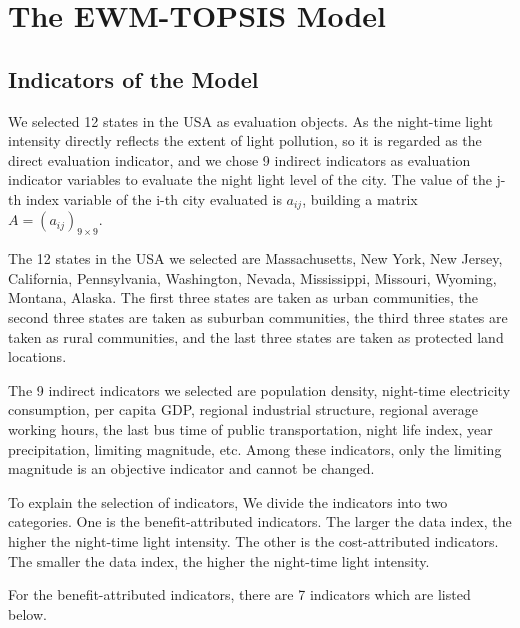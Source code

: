 \section{The EWM-TOPSIS Model}

\subsection{Indicators of the Model}
We selected 12 states in the USA as evaluation objects. As the night-time light intensity directly reflects the extent of light pollution, so it is regarded as the direct evaluation indicator, and we chose 9 indirect indicators as evaluation indicator variables to evaluate the night light level of the city. 
The value of the j-th index variable of the i-th city evaluated is $a_{ij}$, building a matrix $A=(a_{ij})_{9\times9}$.

The 12 states in the USA we selected are Massachusetts, New York, New Jersey, California, Pennsylvania, Washington, Nevada, Mississippi, Missouri, Wyoming, Montana, Alaska. The first three states are taken as urban communities, the second three states are taken as suburban communities, the third three states are taken as rural communities, and the last three states are taken as protected land locations.

The 9 indirect indicators we selected are population density, night-time electricity consumption, per capita GDP, regional industrial structure, regional average working hours, the last bus time of public transportation, night life index, year precipitation, limiting magnitude, etc. Among these indicators, only the limiting magnitude is an objective indicator and cannot be changed.

To explain the selection of indicators, We divide the indicators into two categories. One is the benefit-attributed indicators. The larger the data index, the higher the night-time light intensity. The other is the cost-attributed indicators. The smaller the data index, the higher the night-time light intensity.

For the benefit-attributed indicators, there are 7 indicators which are listed below.

